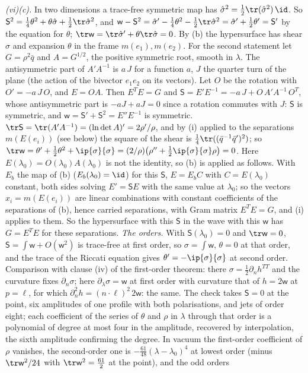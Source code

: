 
\emph{(vi)(c).} In two dimensions a trace-free symmetric map has $\hat\sigma^{2} = \tfrac12\tr(\hat\sigma^{2})\,\id$. So $\mathsf{S}^{2} = \tfrac14\theta^{2} + \theta\hat\sigma + \tfrac12\tr\hat\sigma^{2}$, and $\mathsf{w} - \mathsf{S}^{2} = \hat\sigma' - \tfrac14\theta^{2} - \tfrac12\tr\hat\sigma^{2} = \hat\sigma' + \tfrac12\theta' = \mathsf{S}'$ by the equation for $\theta$; $\tr\mathsf{w} = \tr\hat\sigma' + \theta\tr\hat\sigma = 0$. By (b) the hypersurface has shear $\hat\sigma$ and expansion $\theta$ in the frame $m(e_{1}), m(e_{2})$. For the second statement let $G = \rho^{2}\bar q$ and $A = G^{1/2}$, the positive symmetric root, smooth in $\lambda$. The antisymmetric part of $A'A^{-1}$ is $a\,J$ for a function $a$, $J$ the quarter turn of the plane (the action of the bivector $e_{1}e_{2}$ on its vectors). Let $O$ be the rotation with $O' = -a\,J\,O$, and $E = OA$. Then $E^{T}E = G$ and $\mathsf{S} = E'E^{-1} = -a\,J + O\,A'A^{-1}\,O^{T}$, whose antisymmetric part is $-aJ + aJ = 0$ since a rotation commutes with $J$: $\mathsf{S}$ is symmetric, and $\mathsf{w} = \mathsf{S}' + \mathsf{S}^{2} = E''E^{-1}$ is symmetric. $\tr\mathsf{S} = \tr(A'A^{-1}) = (\ln\det A)' = 2\rho'/\rho$, and by (i) applied to the separations $m(E(e_{i}))$ (see below) the square of the shear is $\tfrac14\tr((\bar q^{-1}\bar q')^{2})$; so $\tr\mathsf{w} = \theta' + \tfrac12\theta^{2} + \ip{\sigma}{\sigma} = (2/\rho)\bigl(\rho'' + \tfrac12\ip{\sigma}{\sigma}\rho\bigr) = 0$. Here $E(\lambda_{0}) = O(\lambda_{0})A(\lambda_{0})$ is not the identity, so (b) is applied as follows. With $E_{b}$ the map of (b) ($E_{b}(\lambda_{0}) = \id$) for this $\mathsf{S}$, $E = E_{b}C$ with $C = E(\lambda_{0})$ constant, both sides solving $E' = \mathsf{S}E$ with the same value at $\lambda_{0}$; so the vectors $x_{i} = m(E(e_{i}))$ are linear combinations with constant coefficients of the separations of (b), hence carried separations, with Gram matrix $E^{T}E = G$, and (i) applies to them. So the hypersurface with this $\mathsf{S}$ in the wave with this $\mathsf{w}$ has $G = E^{T}E$ for these separations. \emph{The orders.} With $\mathsf{S}(\lambda_{0}) = 0$ and $\tr\mathsf{w} = 0$, $\mathsf{S} = \int\mathsf{w} + O(\mathsf{w}^{2})$ is trace-free at first order, so $\sigma = \int\mathsf{w}$, $\theta = 0$ at that order, and the trace of the Riccati equation gives $\theta' = -\ip{\sigma}{\sigma}$ at second order. Comparison with clause (iv) of the first-order theorem: there $\sigma = \tfrac12\partial_{n}h^{TT}$ and the curvature fixes $\partial_{n}\sigma$; here $\partial_{\lambda}\sigma = \mathsf{w}$ at first order with curvature that of $h = 2\mathsf{w}$ at $p = \ell$, for which $\partial_{n}^{2}h = (n \cdot \ell)^{2}\,2\mathsf{w}$: the same. The check takes $\mathsf{S} = 0$ at the point, six amplitudes of one profile with both polarisations, and jets of order eight; each coefficient of the series of $\theta$ and $\rho$ in $\lambda$ through that order is a polynomial of degree at most four in the amplitude, recovered by interpolation, the sixth amplitude confirming the degree. In vacuum the first-order coefficient of $\rho$ vanishes, the second-order one is $-\tfrac{61}{48}(\lambda - \lambda_{0})^{4}$ at lowest order (minus $\tr\mathsf{w}^{2}/24$ with $\tr\mathsf{w}^{2} = \tfrac{61}{2}$ at the point), and the odd orders 